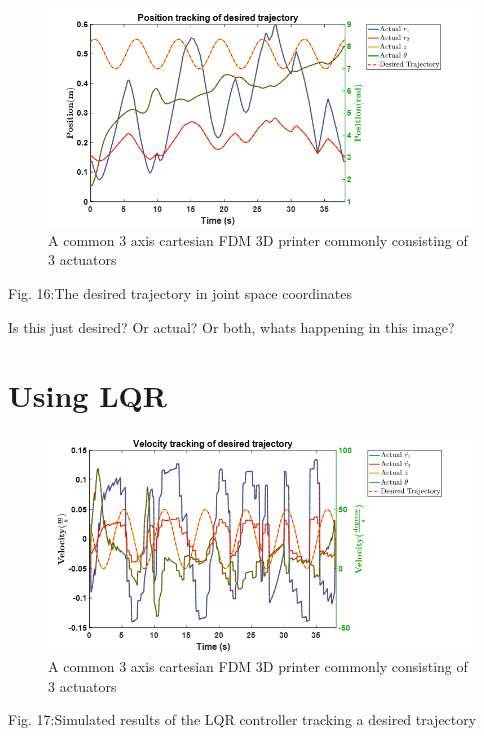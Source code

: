\documentclass{UoNMCHA}
\numberwithin{equation}{section}
\begin{document}
	\begin{figure}[H]
		\begin{center}
			\includegraphics[width=.8\linewidth]{figs/Picture27}
			\caption{A  common 3 axis cartesian FDM 3D printer commonly consisting of 3 actuators}
			\label{figs/Picture27}
		\end{center}
	\end{figure}
	
	Fig. 16:The desired trajectory in joint space coordinates
	
	Is this just desired? Or actual? Or both, whats happening in this image?
	
	
	\section{Using LQR} 
	
	\begin{figure}[H]
		\begin{center}
			\includegraphics[width=.8\linewidth]{figs/Picture28}
			\caption{A  common 3 axis cartesian FDM 3D printer commonly consisting of 3 actuators}
			\label{figs/Picture28}
		\end{center}
	\end{figure}
	
	Fig. 17:Simulated results of the LQR controller tracking a desired trajectory
	
\end{document}

